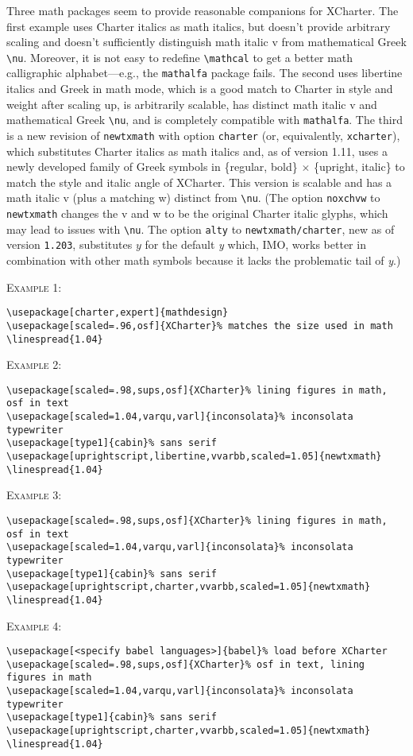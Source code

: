 \documentclass[11pt]{article}
\begin{document}
Three math packages seem to provide reasonable companions for \textsf{XCharter}. The first example uses Charter italics as math italics, but doesn't provide arbitrary scaling and doesn't sufficiently distinguish math italic v from mathematical Greek \verb|\nu|. Moreover, it is not easy to redefine \verb|\mathcal| to get a better math calligraphic alphabet---e.g., the {\tt mathalfa} package fails. The second uses \textsf{libertine} italics and Greek in math mode, which is a good match to Charter in style and weight after scaling up, is arbitrarily scalable, has distinct math italic v and mathematical Greek \verb|\nu|, and is completely compatible with {\tt mathalfa}. The third is a new revision of {\tt newtxmath} with option {\tt charter} (or, equivalently, {\tt xcharter}), which substitutes Charter italics as math italics and, as of version 1.11,  uses a newly developed family of Greek symbols in \{regular, bold\} $\times$ \{upright, italic\} to match the style and italic angle of XCharter. This version is scalable and has a math italic v (plus a matching w) distinct from \verb|\nu|. (The option {\tt noxchvw} to {\tt newtxmath} changes the v and w to be the original Charter italic glyphs, which may lead to issues with \verb|\nu|. The option {\tt alty} to {\tt newtxmath/charter}, new as of version {\tt 1.203}, substitutes $y$ for the default \emph{y} which, IMO, works better in combination with other math symbols because it lacks the problematic tail of \emph{y}.)

\textsc{Example 1:}
\begin{verbatim}
\usepackage[charter,expert]{mathdesign}
\usepackage[scaled=.96,osf]{XCharter}% matches the size used in math
\linespread{1.04}
\end{verbatim}

\textsc{Example 2:}
\begin{verbatim}
\usepackage[scaled=.98,sups,osf]{XCharter}% lining figures in math, osf in text
\usepackage[scaled=1.04,varqu,varl]{inconsolata}% inconsolata typewriter
\usepackage[type1]{cabin}% sans serif
\usepackage[uprightscript,libertine,vvarbb,scaled=1.05]{newtxmath}
\linespread{1.04}
\end{verbatim}

\textsc{Example 3:}
\begin{verbatim}
\usepackage[scaled=.98,sups,osf]{XCharter}% lining figures in math, osf in text
\usepackage[scaled=1.04,varqu,varl]{inconsolata}% inconsolata typewriter
\usepackage[type1]{cabin}% sans serif
\usepackage[uprightscript,charter,vvarbb,scaled=1.05]{newtxmath}
\linespread{1.04}
\end{verbatim}
\textsc{Example 4:}
\begin{verbatim}
\usepackage[<specify babel languages>]{babel}% load before XCharter
\usepackage[scaled=.98,sups,osf]{XCharter}% osf in text, lining figures in math
\usepackage[scaled=1.04,varqu,varl]{inconsolata}% inconsolata typewriter
\usepackage[type1]{cabin}% sans serif
\usepackage[uprightscript,charter,vvarbb,scaled=1.05]{newtxmath}
\linespread{1.04}
\end{verbatim}
\end{document}
